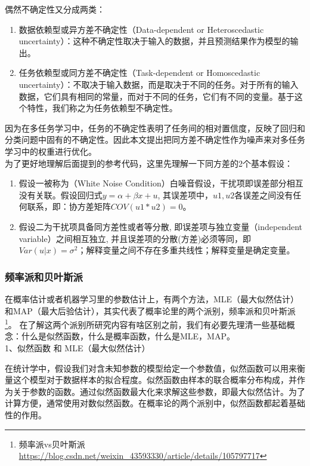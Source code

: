 偶然不确定性又分成两类：
\begin{enumerate}
    \item 数据依赖型或异方差不确定性（Data-dependent or Heteroscedastic uncertainty）：这种不确定性取决于输入的数据，并且预测结果作为模型的输出。
    \item 任务依赖型或同方差不确定性（Task-dependent or Homoscedastic uncertainty）：不取决于输入数据，而是取决于不同的任务。对于所有的输入数据，它们具有相同的常量，而对于不同的任务，它们有不同的变量。基于这个特性，我们称之为任务依赖型不确定性。
\end{enumerate}

因为在多任务学习中，任务的不确定性表明了任务间的相对置信度，反映了回归和分类问题中固有的不确定性。因此本文提出把同方差不确定性作为噪声来对多任务学习中的权重进行优化。\\

为了更好地理解后面提到的参考代码，这里先理解一下同方差的2个基本假设：
\begin{enumerate}
    \item 假设一被称为（White Noise Condition）白噪音假设，干扰项即误差部分相互没有关联。假设回归式$y=\alpha + \beta x + u$, 其误差项中，$u1,u2$各误差之间没有任何联系，即：协方差矩阵$COV(u1 * u2)= 0$。
    \item 假设二为干扰项具备同方差性或者等分散, 即误差项与独立变量（independent variable）之间相互独立, 并且误差项的分散(方差)必须等同，即$Var(u|x)=\sigma^2$；解释变量之间不存在多重共线性；解释变量是确定变量。
\end{enumerate}

\subsubsection{频率派和贝叶斯派}

在概率估计或者机器学习里的参数估计上，有两个方法，MLE（最大似然估计） 和MAP（最大后验估计），其实代表了概率论里的两个派别，频率派和贝叶斯派\footnote{频率派vs贝叶斯派 \quad \url{https://blog.csdn.net/weixin_43593330/article/details/105797717}}。 在了解这两个派别所研究内容有啥区别之前，我们有必要先理清一些基础概念：什么是似然函数，什么是概率函数，什么是MLE，MAP。\\

1、似然函数 和 MLE（最大似然估计）

在统计学中，假设我们对含未知参数的模型给定一个参数值，似然函数可以用来衡量这个模型对于数据样本的拟合程度。似然函数由样本的联合概率分布构成，并作为关于参数的函数。通过似然函数最大化来求解这些参数，即最大似然估计。为了计算方便，通常使用对数似然函数。在概率论的两个派别中，似然函数都起着基础性的作用。\\

